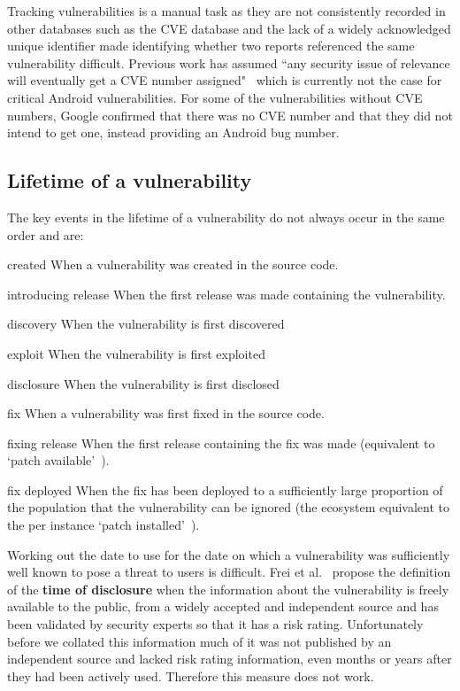 \documentclass[conference,a4paper,twoside]{IEEEtran}
\begin{document}
Tracking vulnerabilities is a manual task as they are not consistently recorded in other databases such as the CVE database and the lack of a widely acknowledged unique identifier made identifying whether two reports referenced the same vulnerability difficult.
Previous work has assumed ``any security issue of relevance will eventually get a CVE number assigned"~\cite{Frei2010} which is currently not the case for critical Android vulnerabilities.
For some of the vulnerabilities without CVE numbers, Google confirmed that there was no CVE number and that they did not intend to get one, instead providing an Android bug number.


\subsection{Lifetime of a vulnerability}

The key events in the lifetime of a vulnerability do not always occur in the same order and are:

\begin{LaTeXdescription}
 \item[created] When a vulnerability was created in the source code.
 \item[introducing release] When the first release was made containing the vulnerability.
 \item[discovery] When the vulnerability is first discovered
 \item[exploit] When the vulnerability is first exploited
 \item[disclosure] When the vulnerability is first disclosed %
 \item[fix] When a vulnerability was first fixed in the source code.
 \item[fixing release] When the first release containing the fix was made (equivalent to `patch available'~\cite{Frei2010}).
 \item[fix deployed] When the fix has been deployed to a sufficiently large proportion of the population that the vulnerability can be ignored (the ecosystem equivalent to the per instance `patch installed'~\cite{Frei2010}).
\end{LaTeXdescription}

Working out the date to use for the date on which a vulnerability was sufficiently well known to pose a threat to users is difficult.
Frei et al.~\cite{Frei2010} propose the definition of the {\bf time of disclosure} when the information about the vulnerability is freely available to the public, from a widely accepted and independent source and has been validated by security experts so that it has a risk rating.
Unfortunately before we collated this information much of it was not published by an independent source and lacked risk rating information, even months or years after they had been actively used.
Therefore this measure does not work.
\end{document}
